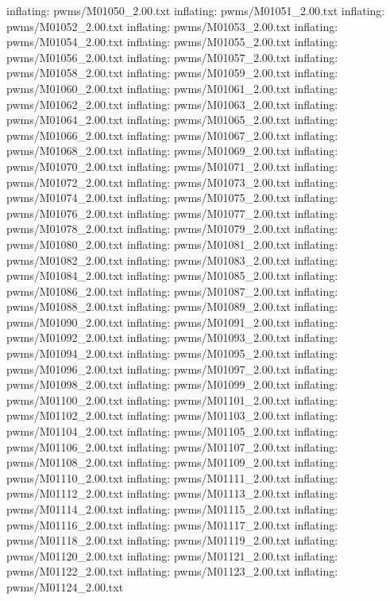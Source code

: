 \documentclass[letterpaper,10pt,english]{sphinxmanual}
\begin{document}
{\begin{sphinxVerbatim}[commandchars=\\\{\}]
  inflating: pwms/M01050\_2.00.txt
  inflating: pwms/M01051\_2.00.txt
  inflating: pwms/M01052\_2.00.txt
  inflating: pwms/M01053\_2.00.txt
  inflating: pwms/M01054\_2.00.txt
  inflating: pwms/M01055\_2.00.txt
  inflating: pwms/M01056\_2.00.txt
  inflating: pwms/M01057\_2.00.txt
  inflating: pwms/M01058\_2.00.txt
  inflating: pwms/M01059\_2.00.txt
  inflating: pwms/M01060\_2.00.txt
  inflating: pwms/M01061\_2.00.txt
  inflating: pwms/M01062\_2.00.txt
  inflating: pwms/M01063\_2.00.txt
  inflating: pwms/M01064\_2.00.txt
  inflating: pwms/M01065\_2.00.txt
  inflating: pwms/M01066\_2.00.txt
  inflating: pwms/M01067\_2.00.txt
  inflating: pwms/M01068\_2.00.txt
  inflating: pwms/M01069\_2.00.txt
  inflating: pwms/M01070\_2.00.txt
  inflating: pwms/M01071\_2.00.txt
  inflating: pwms/M01072\_2.00.txt
  inflating: pwms/M01073\_2.00.txt
  inflating: pwms/M01074\_2.00.txt
  inflating: pwms/M01075\_2.00.txt
  inflating: pwms/M01076\_2.00.txt
  inflating: pwms/M01077\_2.00.txt
  inflating: pwms/M01078\_2.00.txt
  inflating: pwms/M01079\_2.00.txt
  inflating: pwms/M01080\_2.00.txt
  inflating: pwms/M01081\_2.00.txt
  inflating: pwms/M01082\_2.00.txt
  inflating: pwms/M01083\_2.00.txt
  inflating: pwms/M01084\_2.00.txt
  inflating: pwms/M01085\_2.00.txt
  inflating: pwms/M01086\_2.00.txt
  inflating: pwms/M01087\_2.00.txt
  inflating: pwms/M01088\_2.00.txt
  inflating: pwms/M01089\_2.00.txt
  inflating: pwms/M01090\_2.00.txt
  inflating: pwms/M01091\_2.00.txt
  inflating: pwms/M01092\_2.00.txt
  inflating: pwms/M01093\_2.00.txt
  inflating: pwms/M01094\_2.00.txt
  inflating: pwms/M01095\_2.00.txt
  inflating: pwms/M01096\_2.00.txt
  inflating: pwms/M01097\_2.00.txt
  inflating: pwms/M01098\_2.00.txt
  inflating: pwms/M01099\_2.00.txt
  inflating: pwms/M01100\_2.00.txt
  inflating: pwms/M01101\_2.00.txt
  inflating: pwms/M01102\_2.00.txt
  inflating: pwms/M01103\_2.00.txt
  inflating: pwms/M01104\_2.00.txt
  inflating: pwms/M01105\_2.00.txt
  inflating: pwms/M01106\_2.00.txt
  inflating: pwms/M01107\_2.00.txt
  inflating: pwms/M01108\_2.00.txt
  inflating: pwms/M01109\_2.00.txt
  inflating: pwms/M01110\_2.00.txt
  inflating: pwms/M01111\_2.00.txt
  inflating: pwms/M01112\_2.00.txt
  inflating: pwms/M01113\_2.00.txt
  inflating: pwms/M01114\_2.00.txt
  inflating: pwms/M01115\_2.00.txt
  inflating: pwms/M01116\_2.00.txt
  inflating: pwms/M01117\_2.00.txt
  inflating: pwms/M01118\_2.00.txt
  inflating: pwms/M01119\_2.00.txt
  inflating: pwms/M01120\_2.00.txt
  inflating: pwms/M01121\_2.00.txt
  inflating: pwms/M01122\_2.00.txt
  inflating: pwms/M01123\_2.00.txt
  inflating: pwms/M01124\_2.00.txt

\end{sphinxVerbatim}}
\end{document}
